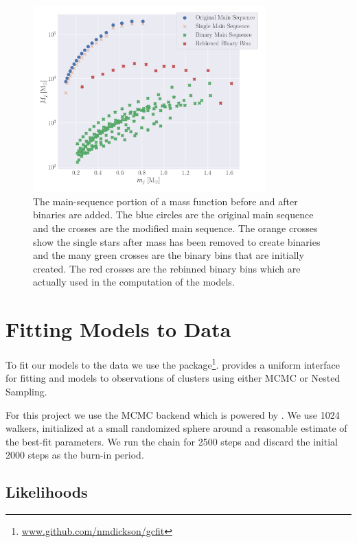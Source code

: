 \begin{figure}
    \centering
    \includegraphics[width=0.8\textwidth]{figures/shifted-mf.png}
    \caption{The main-sequence portion of a mass function before and after binaries are added. The
        blue circles are the original main sequence and the crosses are the modified main sequence.
        The orange crosses show the single stars after mass has been removed to create binaries and
        the many green crosses are the binary bins that are initially created. The red crosses are
        the rebinned binary bins which are actually used in the computation of the 
        models.}
    \label{fig:2/shifted-mf}
\end{figure}



\section{Fitting Models to Data}


To fit our models to the data we use the 
package\footnote{\url{www.github.com/nmdickson/gcfit}}.  provides a uniform interface
for fitting \evolvemf{} and  models to observations of clusters using either MCMC or
Nested Sampling.

For this project we use the MCMC backend which is powered by 
\citet{Foreman-Mackey2013,Foreman-Mackey2019}. We use 1024 walkers, initialized at a small
randomized sphere around a reasonable estimate of the best-fit parameters. We run the chain for 2500
steps and discard the initial 2000 steps as the burn-in period.

\subsection{Likelihoods}

